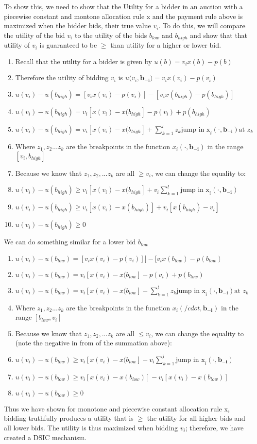 \documentclass{article}
\begin{document}
To show this, we need to show that the Utility for a bidder in an auction
with a piecewise constant and montone allocation rule x and the payment rule
above is maximized when the bidder bids, their true value $v_i$.  To do this,
we will compare the utility of the bid $v_i$ to the utility of the bids
$b_{low}$ and $b_{high}$ and show that that utility of $v_i$ is guaranteed to
be $\geq$ than utility for a higher or lower bid.

\begin{enumerate}
	\item Recall that the utility for a bidder is given by $u(b) = v_i x(b) -
		p(b)$ 
	\item Therefore the utility of bidding $v_i$ is $u(v_i, \mathbf{b_{-i})} =
		v_i x(v_i) - p(v_i)$
	\item $u(v_i) - u(b_{high}) = [v_i x(v_i) - p(v_i)] - [v_i x(b_{high}) -
		p(b_{high})]$
	\item $u(v_i) - u(b_{high}) = v_i[x(v_i) - x(b_{high}] - p(v_i) + p(b_{high})$
\item $u(v_i) - u(b_{high}) = v_i[x(v_i) - x(b_{high}] +
	\sum_{k=1}^{l}z_k\text{jump in x}_i(\cdot, \bm{b_{-i}}) \text{at }z_k $
\item Where $z_1, z_2...z_k$ are the breakpoints in the function $x_i(\cdot,
	\bm{b_{-i}})$ in the range $[v_i, b_{high}]$
\item Because we know that $z_1, z_2,...z_k$ are all $\geq v_i$, we can change
	the equality to:
\item $u(v_i) - u(b_{high}) \geq v_i[x(v_i) - x(b_{high}] + v_i
	\sum_{k=1}^{l}\text{jump in x}_i(\cdot, \bm{b_{-i}})$ 
\item $u(v_i) - u(b_{high}) \geq v_i[x(v_i) - x(b_{high})] + v_i [x(b_{high}) -
	v_i]$
\item $u(v_i) - u(b_{high}) \geq 0$
\end{enumerate}

We can do something similar for a lower bid $b_{low}$

\begin{enumerate}
\item $u(v_i) - u(b_{low}) = [v_i x(v_i) - p(v_i)]] - [v_i x(b_{low}) -
		p(b_{low})$
\item $u(v_i) - u(b_{low}) = v_i[x(v_i) - x(b_{low}] - p(v_i) + p(b_{low})$
\item $u(v_i) - u(b_{low}) = v_i[x(v_i) - x(b_{low}] -
	\sum_{k=1}^{l}z_k\text{jump in x}_i(\cdot, \bm{b_{-i}}) \text{at }z_k $
\item Where $z_1, z_2...z_k$ are the breakpoints in the function $x_i(/cdot,
	\bm{b_{-i}})$ in the range $[b_{low}, v_i]$
\item Because we know that $z_1, z_2,...z_k$ are all $\leq v_i$, we can change
	the equality to (note the negative in from of the summation above):
\item $u(v_i) - u(b_{low}) \geq v_i[x(v_i) - x(b_{low}] - v_i
	\sum_{k=1}^{l}\text{jump in x}_i(\cdot, \bm{b_{-i}})$ 
\item $u(v_i) - u(b_{low}) \geq v_i[x(v_i) - x(b_{low})] - v_i [x(v_i) -
	x(b_{low})]$
\item $u(v_i) - u(b_{low}) \geq 0$
\end{enumerate}

Thus we have shown for monotone and piecewise constant allocation rule x,
bidding truthfully produces a utility that is $\geq$ the utility for all
higher bids and all lower bids. The utility is thus maximized when bidding
$v_i$; therefore, we have created a DSIC mechanism.
\end{document}
